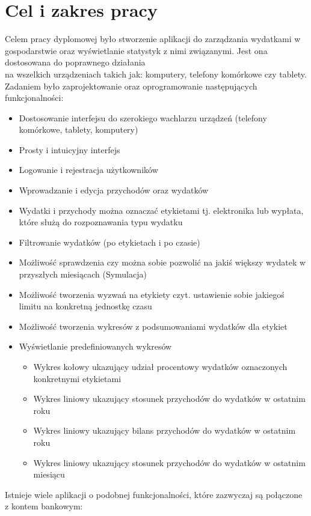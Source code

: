 \documentclass[10pt,titlepage]{article}
\begin{document}
\section{Cel i zakres pracy}
\par Celem pracy dyplomowej było stworzenie aplikacji do zarządzania wydatkami w gospodarstwie oraz wyświetlanie statystyk z nimi związanymi. Jest ona dostosowana do poprawnego działania\\ na wszelkich urządzeniach takich jak: komputery, telefony komórkowe czy tablety. Zadaniem było zaprojektowanie oraz oprogramowanie następujących funkcjonalności:
\begin{itemize}
  \item Dostosowanie interfejsu do szerokiego wachlarzu urządzeń (telefony komórkowe, tablety, komputery)
  \item Prosty i intuicyjny interfejs
  \item Logowanie i rejestracja użytkowników
  \item Wprowadzanie i edycja przychodów oraz wydatków
  \item Wydatki i przychody można oznaczać etykietami tj. elektronika lub wypłata, które służą do rozpoznawania typu wydatku
  \item Filtrowanie wydatków (po etykietach i po czasie)
  \item Możliwość sprawdzenia czy można sobie pozwolić na jakiś większy wydatek w przyszłych miesiącach (Symulacja)
  \item Możliwość tworzenia wyzwań na etykiety czyt. ustawienie sobie jakiegoś limitu na konkretną jednostkę czasu
  \item Możliwość tworzenia wykresów z podsumowaniami wydatków dla etykiet
  \item Wyświetlanie predefiniowanych wykresów
    \begin{itemize}
      \item Wykres kołowy ukazujący udział procentowy wydatków oznaczonych konkretnymi etykietami
      \item Wykres liniowy ukazujący stosunek przychodów do wydatków w ostatnim roku
      \item Wykres liniowy ukazujący bilans przychodów do wydatków w ostatnim roku
      \item Wykres liniowy ukazujący stosunek przychodów do wydatków w ostatnim miesiącu
    \end{itemize}
\end{itemize}
Istnieje wiele aplikacji o podobnej funkcjonalności, które zazwyczaj są połączone z kontem bankowym:
\end{document}
